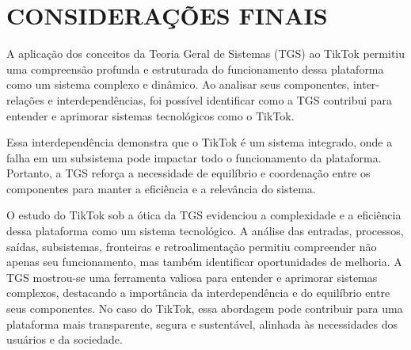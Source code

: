 \section{CONSIDERAÇÕES FINAIS}

A aplicação dos conceitos da Teoria Geral de Sistemas (TGS) ao TikTok permitiu uma compreensão profunda e estruturada do funcionamento dessa plataforma como um sistema complexo e dinâmico. Ao analisar seus componentes, inter-relações e interdependências, foi possível identificar como a TGS contribui para entender e aprimorar sistemas tecnológicos como o TikTok. \vskip0.3cm

Essa interdependência demonstra que o TikTok é um sistema integrado, onde a falha em um subsistema pode impactar todo o funcionamento da plataforma. Portanto, a TGS reforça a necessidade de equilíbrio e coordenação entre os componentes para manter a eficiência e a relevância do sistema. \vskip0.3cm

O estudo do TikTok sob a ótica da TGS evidenciou a complexidade e a eficiência dessa plataforma como um sistema tecnológico. A análise das entradas, processos, saídas, subsistemas, fronteiras e retroalimentação permitiu compreender não apenas seu funcionamento, mas também identificar oportunidades de melhoria. A TGS mostrou-se uma ferramenta valiosa para entender e aprimorar sistemas complexos, destacando a importância da interdependência e do equilíbrio entre seus componentes. No caso do TikTok, essa abordagem pode contribuir para uma plataforma mais transparente, segura e sustentável, alinhada às necessidades dos usuários e da sociedade.



